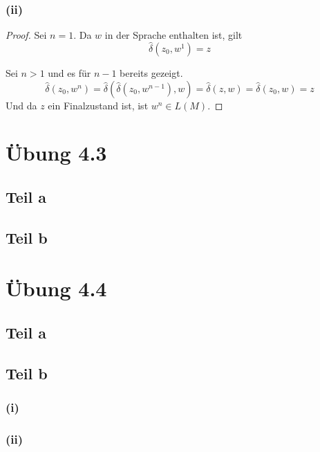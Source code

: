 \documentclass[10pt,a4paper]{article}
\begin{document}
\subsubsection{(ii)}

\begin{proof}
  Sei $n = 1$.
  Da $w$ in der Sprache enthalten ist, gilt
  \begin{equation}
    \hat{\delta}(z_{0}, w^{1}) = z
  \end{equation}

  Sei $n > 1$ und es für $n - 1$ bereits gezeigt.
  \begin{equation}
    \hat{\delta}(z_{0}, w^{n}) = \hat{\delta}(\hat{\delta}(z_{0}, w^{n - 1}), w) = \hat{\delta}(z, w) = \hat{\delta}(z_{0}, w) = z
  \end{equation}
  Und da $z$ ein Finalzustand ist, ist $w^{n} \in L(M)$.
\end{proof}

\section{Übung 4.3}

\subsection{Teil a}

\subsection{Teil b}

\section{Übung 4.4}

\subsection{Teil a}

\subsection{Teil b}

\subsubsection{(i)}

\subsubsection{(ii)}
\end{document}
